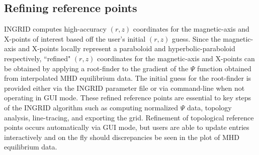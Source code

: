 \subsection{Refining reference points}
 INGRID computes high-accuracy $(r, z)$ coordinates for the magnetic-axis and X-points of interest based off the user's initial $(r, z)$ guess. Since the magnetic-axis and X-points locally represent a paraboloid and hyperbolic-paraboloid respectively, ``refined" $(r, z)$ coordinates for the magnetic-axis and X-points can be obtained by applying a root-finder to the gradient of the $\Psi$ function obtained from interpolated MHD equilibrium data. The initial guess for the root-finder is provided either via the INGRID parameter file or via command-line when not operating in GUI mode. These refined reference points are essential to key steps of the INGRID algorithm such as computing normalized $\Psi$ data, topology analysis, line-tracing, and exporting the grid. Refinement of topological reference points occurs automatically via GUI mode, but users are able to update entries interactively and on the fly should discrepancies be seen in the plot of MHD equilibrium data.
